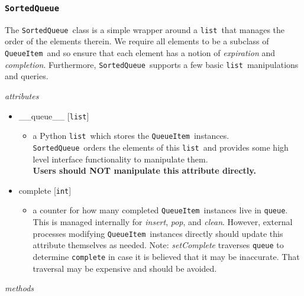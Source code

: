\documentclass{article}
\newcommand{\SortedQueue}{\texttt{SortedQueue}}
\newcommand{\QueueItem}{\texttt{QueueItem}}
\newcommand{\pythonint}{\texttt{int}}
\newcommand{\pythonlist}{\texttt{list}}
\begin{document}

\subsubsection{\SortedQueue}
\label{sec: SortedQueue}

The \SortedQueue~class is a simple wrapper around a \pythonlist~that manages the order of the elements therein.
We require all elements to be a subclass of \QueueItem~and so ensure that each element has a notion of \textit{expiration} and \textit{completion}.
Furthermore, \SortedQueue~supports a few basic \pythonlist~manipulations and queries.

\vspace{0.5cm}
\noindent
\textit{attributes}

\begin{itemize}
    \item{\_\_queue\_\_ [\pythonlist]
        \begin{itemize}
            \item{a Python \pythonlist~which stores the \QueueItem~instances. \SortedQueue~orders the elements of this \pythonlist~and provides some high level interface functionality to manipulate them. \\ \textbf{Users should NOT manipulate this attribute directly.}}
        \end{itemize}
         }
    \item{complete [\pythonint]
        \begin{itemize}
            \item{a counter for how many completed \QueueItem~instances live in \texttt{queue}. This is managed internally for \textit{insert}, \textit{pop}, and \textit{clean}. However, external processes modifying \QueueItem~instances directly should update this attribute themselves as needed. Note: \textit{setComplete} traverses \texttt{queue} to determine \texttt{complete} in case it is believed that it may be inaccurate. That traversal may be expensive and should be avoided.}
        \end{itemize}
         }
\end{itemize}

\noindent
\textit{methods}
\end{document}
